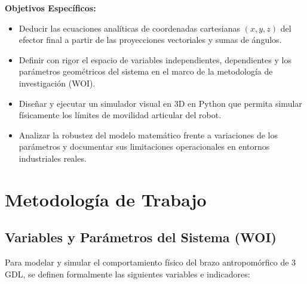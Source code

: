 \documentclass[11pt,a4paper]{article}
\begin{document}
\textbf{Objetivos Específicos:}
\begin{itemize}
    \item Deducir las ecuaciones analíticas de coordenadas cartesianas $(x, y, z)$ del efector final a partir de las proyecciones vectoriales y sumas de ángulos.
    \item Definir con rigor el espacio de variables independientes, dependientes y los parámetros geométricos del sistema en el marco de la metodología de investigación (WOI).
    \item Diseñar y ejecutar un simulador visual en 3D en Python que permita simular físicamente los límites de movilidad articular del robot.
    \item Analizar la robustez del modelo matemático frente a variaciones de los parámetros y documentar sus limitaciones operacionales en entornos industriales reales.
\end{itemize}

\newpage

\section{Metodología de Trabajo}

\subsection{Variables y Parámetros del Sistema (WOI)}
Para modelar y simular el comportamiento físico del brazo antropomórfico de 3 GDL, se definen formalmente las siguientes variables e indicadores:
\end{document}
